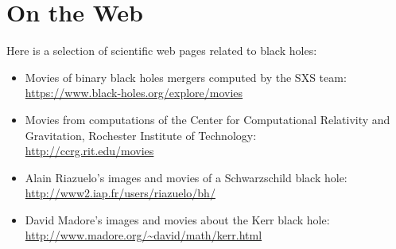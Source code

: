 \chapter{On the Web} \label{s:web}

\minitoc

Here is a selection of scientific web pages related to black holes:

\begin{itemize}
\item Movies of binary black holes mergers computed by the SXS team:\\
\url{https://www.black-holes.org/explore/movies}
\item Movies from computations of the Center for Computational Relativity
and Gravitation, Rochester Institute of Technology:\\
\url{http://ccrg.rit.edu/movies}
\item Alain Riazuelo's images and movies of a Schwarzschild black hole:\\
\url{http://www2.iap.fr/users/riazuelo/bh/}
\item David Madore's images and movies about the Kerr black hole:\\
\url{http://www.madore.org/~david/math/kerr.html}
\end{itemize}

